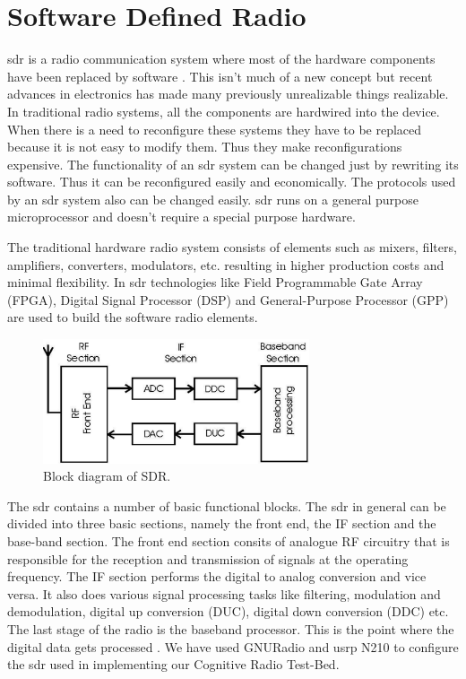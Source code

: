 \chapter{Software Defined Radio}

\gls{sdr} is a radio communication system where most of the 
hardware components have been replaced by software \cite{wikiSDR}. This isn't
much of a new concept but recent advances in electronics has made many
previously unrealizable things realizable. In traditional
radio systems, all the components are hardwired into the device. When there is
a need to reconfigure these systems they have to be replaced because it is
not easy to modify them. Thus they make reconfigurations expensive. The 
functionality of an \gls{sdr} system can be changed just by rewriting its software.
Thus it can be reconfigured easily and economically.
The protocols used by an \gls{sdr} system also can be changed
easily. \gls{sdr} runs on a general
purpose microprocessor and doesn't require a special purpose hardware.

The traditional hardware radio system consists of elements such as mixers, 
filters, amplifiers, converters, modulators, etc. resulting in higher 
production costs and minimal flexibility. In \gls{sdr} technologies like 
Field Programmable Gate Array (FPGA), Digital Signal Processor (DSP) and 
General-Purpose Processor (GPP) are used to build the software radio elements.


\begin{figure}
  \centering
  \includegraphics[width=0.7\textwidth]{../images/sdrBlock}
  \caption{Block diagram of SDR.}
  \label{sdrBlock}
\end{figure}

The \gls{sdr} contains a number of basic functional blocks.
The \gls{sdr} in general can be divided into three basic sections, namely the front
end, the IF section and the base-band section. The front end section consits 
of analogue RF circuitry that is responsible for the reception and 
transmission of signals at the operating frequency. The IF section performs
the digital to analog conversion and vice versa. It also does various signal 
processing tasks like filtering, modulation and demodulation, digital up 
conversion (DUC), digital down conversion (DDC) etc. The last stage of the 
radio is the baseband processor. This is the point where the digital data 
gets processed \cite{miller08}\cite{kranthi13}.
We have used GNURadio and \gls{usrp} N210 to configure the \gls{sdr} used in implementing
our Cognitive Radio Test-Bed. 

